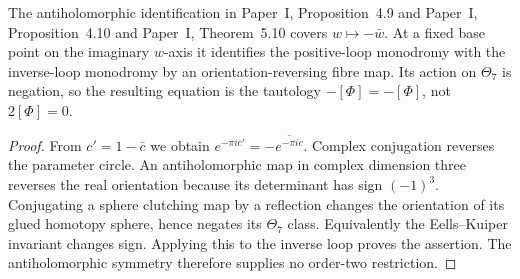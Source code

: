 \begin{proposition}\label{push:src:C.4.2}
The antiholomorphic identification in Paper~I, Proposition~4.9 and Paper~I, Proposition~4.10 and Paper~I, Theorem~5.10 covers
$w\mapsto-\bar w$. At a fixed base point on the imaginary
$w$-axis it identifies the positive-loop monodromy with the
inverse-loop monodromy by an orientation-reversing fibre map.
Its action on $\Theta_7$ is negation, so the resulting equation is
the tautology $-[\Phi]=-[\Phi]$, not $2[\Phi]=0$.
\end{proposition}

\begin{proof}
From $c'=1-\bar c$ we obtain
$e^{-\pi ic'}=-\overline{e^{-\pi ic}}$.
Complex conjugation reverses the parameter circle. An
antiholomorphic map in complex dimension three reverses the real
orientation because its determinant has sign $(-1)^3$.
Conjugating a sphere clutching map by a reflection changes the
orientation of its glued homotopy sphere, hence negates its
$\Theta_7$ class. Equivalently the Eells--Kuiper invariant changes
sign. Applying this to the inverse loop proves the assertion.
The antiholomorphic symmetry therefore supplies no order-two restriction.
\end{proof}

